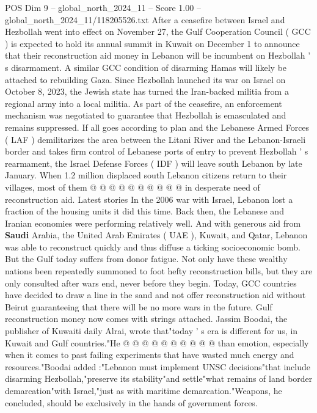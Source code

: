 \begin{textsample}{POS Dim 9 – global\_north\_2024\_11 – Score 1.00 – global\_north\_2024\_11/118205526.txt}  \label{ex:f9_pos_242}
After a ceasefire between Israel and Hezbollah went into effect on November 27, the Gulf Cooperation Council ( GCC ) is expected to hold its annual summit in Kuwait on December 1 to announce that their reconstruction aid money in Lebanon will be incumbent on Hezbollah ' s disarmament.
A similar GCC condition of disarming Hamas will likely be attached to rebuilding Gaza.
Since Hezbollah launched its war on Israel on October 8, 2023, the Jewish state has turned the Iran-backed militia from a regional army into a local militia.
As part of the ceasefire, an enforcement mechanism was negotiated to guarantee that Hezbollah is emasculated and remains suppressed.
If all goes according to plan and the Lebanese Armed Forces ( LAF ) demilitarizes the area between the Litani River and the Lebanon-Israeli border and takes firm control of Lebanese ports of entry to prevent Hezbollah ' s rearmament, the Israel Defense Forces ( IDF ) will leave south Lebanon by late January.
When 1.2 million displaced south Lebanon citizens return to their villages, most of them @ @ @ @ @ @ @ @ @ @ in desperate need of reconstruction aid.
Latest stories In the 2006 war with Israel, Lebanon lost a fraction of the housing units it did this time.
Back then, the Lebanese and Iranian economies were performing relatively well.
And with generous aid from \textbf{Saudi} Arabia, the United Arab Emirates ( UAE ), Kuwait, and Qatar, Lebanon was able to reconstruct quickly and thus diffuse a ticking socioeconomic bomb.
But the Gulf today suffers from donor fatigue.
Not only have these wealthy nations been repeatedly summoned to foot hefty reconstruction bills, but they are only consulted after wars end, never before they begin.
Today, GCC countries have decided to draw a line in the sand and not offer reconstruction aid without Beirut guaranteeing that there will be no more wars in the future.
Gulf reconstruction money now comes with strings attached.
Jassim Boodai, the publisher of Kuwaiti daily Alrai, wrote that"today ' s era is different for us, in Kuwait and Gulf countries."He @ @ @ @ @ @ @ @ @ @ than emotion, especially when it comes to past failing experiments that have wasted much energy and resources."Boodai added :"Lebanon must implement UNSC decisions"that include disarming Hezbollah,"preserve its stability"and settle"what remains of land border demarcation"with Israel,"just as with maritime demarcation."Weapons, he concluded, should be exclusively in the hands of government forces.

\end{textsample}
